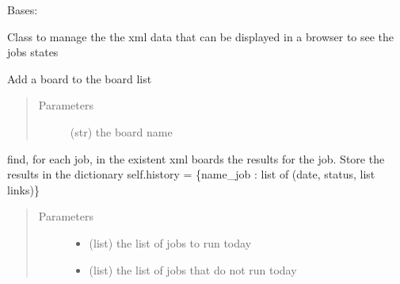 \documentclass[a4paper,10pt,english]{sphinxmanual}
\begin{document}
\begin{fulllineitems}
\label{\detokenize{apidoc_commands/commands:commands.jobs.Gui}}
Bases: 

Class to manage the the xml data that can be displayed in a browser 
to see the jobs states

\begin{fulllineitems}
\label{\detokenize{apidoc_commands/commands:commands.jobs.Gui.add_xml_board}}
Add a board to the board list
\begin{quote}\begin{description}
\item[{Parameters}] \leavevmode
{} \textendash{} (str) the board name

\end{description}\end{quote}

\end{fulllineitems}


\begin{fulllineitems}
\label{\detokenize{apidoc_commands/commands:commands.jobs.Gui.find_history}}
find, for each job, in the existent xml boards the results for the job.
Store the results in the dictionary 
self.history = \{name\_job : list of (date, status, list links)\}
\begin{quote}\begin{description}
\item[{Parameters}] \leavevmode\begin{itemize}
\item {} 
 \textendash{} (list) 
the list of jobs to run today

\item {} 
 \textendash{} (list) 
the list of jobs that do not run today


\end{itemize}
\end{description}
\end{quote}
\end{fulllineitems}
\end{fulllineitems}
\end{document}

